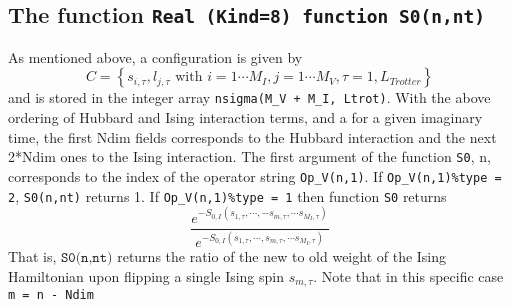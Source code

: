 \subsection{The function \texttt{Real (Kind=8) function S0(n,nt)} }\label{sec:s0}
As mentioned above,  a configuration is given by
\begin{equation}
	C = \left\{   s_{i,\tau} ,  l_{j,\tau}  \text{ with }  i=1\cdots M_I,  j = 1\cdots M_V,  \tau=1,L_{Trotter}  \right\}
\end{equation}
and is stored in the  integer array \texttt{nsigma(M\_V + M\_I, Ltrot)}.  With the above ordering of Hubbard and Ising interaction terms,  and a for a given  imaginary time, the first Ndim 
fields corresponds to the Hubbard  interaction and the next 2*Ndim ones to the Ising interaction.    The first   argument of the function \texttt{S0}, n,  corresponds to the index of the operator  string 
\texttt{Op\_V(n,1)}. If \texttt{Op\_V(n,1)\%type = 2},    \texttt{S0(n,nt)}  returns 1.  If   \texttt{Op\_V(n,1)\%type = 1}  then function \texttt{S0}  returns
\begin{equation}
\frac{e^{-S_{0,I} \left(  s_{1,\tau},  \cdots,  - s_{m,\tau},  \cdots s_{M_I,\tau}   \right) } }{e^{-S_{0,I}  \left(  s_{1,\tau},  \cdots,   s_{m,\tau},  \cdots s_{M_I,\tau}   \right)   } }	
\end{equation}
That is,  $ \texttt{S0(n,nt)} $  returns the ratio of the new to old weight  of the  Ising Hamiltonian upon flipping a single Ising spin $ s_{m,\tau} $. Note that in  this specific case  \texttt{ m = n -  Ndim } 
 

